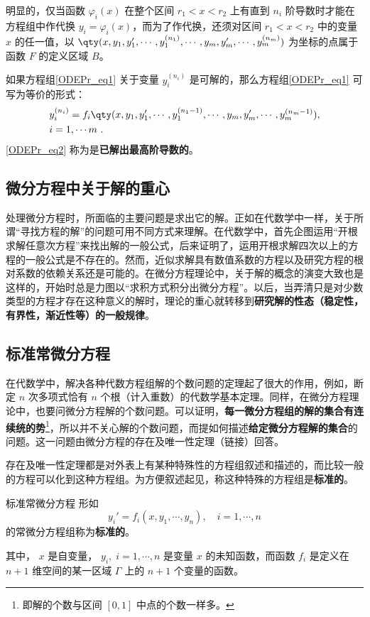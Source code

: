 明显的，仅当函数 $\varphi_i(x)$ 在整个区间 $r_1<x<r_2$ 上有直到 $n_i$ 阶导数时才能在方程组中作代换 $y_i=\varphi_i(x)$，而为了作代换，还须对区间 $r_1<x<r_2$ 中的变量 $x$ 的任一值，以 $\qty(x,y_1,y_1',\cdots,y_1^{(n_1)},\cdots,y_m,y_m',\cdots,y_m^{(n_m)})$ 为坐标的点属于函数 $F$ 的定义区域 $B$。

如果方程组\autoref{ODEPr_eq1} 关于变量 $y_i^{(n_i)}$ 是可解的，那么方程组\autoref{ODEPr_eq1} 可写为等价的形式： 
\begin{equation}\label{ODEPr_eq2}
\begin{aligned}
&y_i^{(n_i)}=f_i\qty(x,y_1,y_1',\cdots,y_1^{(n_1-1)},\cdots,y_m,y_m',\cdots,y_m^{(n_m-1)}),\\
& i=1,\cdots m~.
\end{aligned}
\end{equation}
\autoref{ODEPr_eq2} 称为是\textbf{已解出最高阶导数的}。
\subsection{微分方程中关于解的重心}
处理微分方程时，所面临的主要问题是求出它的解。正如在代数学中一样，关于所谓“寻找方程的解”的问题可用不同方式来理解。在代数学中，首先企图运用“开根求解任意次方程”来找出解的一般公式，后来证明了，运用开根求解四次以上的方程的一般公式是不存在的。然而，近似求解具有数值系数的方程以及研究方程的根对系数的依赖关系还是可能的。在微分方程理论中，关于解的概念的演变大致也是这样的，开始时总是力图以“求积方式积分出微分方程”。以后，当弄清只是对少数类型的方程才存在这种意义的解时，理论的重心就转移到\textbf{研究解的性态（稳定性，有界性，渐近性等）的一般规律}。
\subsection{标准常微分方程}\label{ODEPr_sub1}
在代数学中，解决各种代数方程组解的个数问题的定理起了很大的作用，例如，断定 $n$ 次多项式恰有 $n$ 个根（计入重数）的代数学基本定理。同样，在微分方程理论中，也要问微分方程解的个数问题。可以证明，\textbf{每一微分方程组的解的集合有连续统的势}\footnote{即解的个数与区间 $[0,1]$ 中点的个数一样多。}，所以并不关心解的个数问题，而提如何描述\textbf{给定微分方程解的集合}的问题。这一问题由微分方程的存在及唯一性定理（链接）回答。

存在及唯一性定理都是对外表上有某种特殊性的方程组叙述和描述的，而比较一般的方程可以化到这种方程组。为方便叙述起见，称这种特殊的方程组是\textbf{标准的}。

\begin{definition}{标准常微分方程}\label{ODEPr_def1}
形如
\begin{equation}
y_i'=f_i(x,y_1,\cdots,y_n),\quad i=1,\cdots,n
\end{equation}
的常微分方程组称为\textbf{标准的}。

其中， $x$ 是自变量， $y_i,\; i=1,\cdots, n$ 是变量 $x$ 的未知函数，而函数 $f_i$ 是定义在 $n+1$ 维空间的某一区域 $\Gamma$ 上的 $n+1$ 个变量的函数。
\end{definition}


